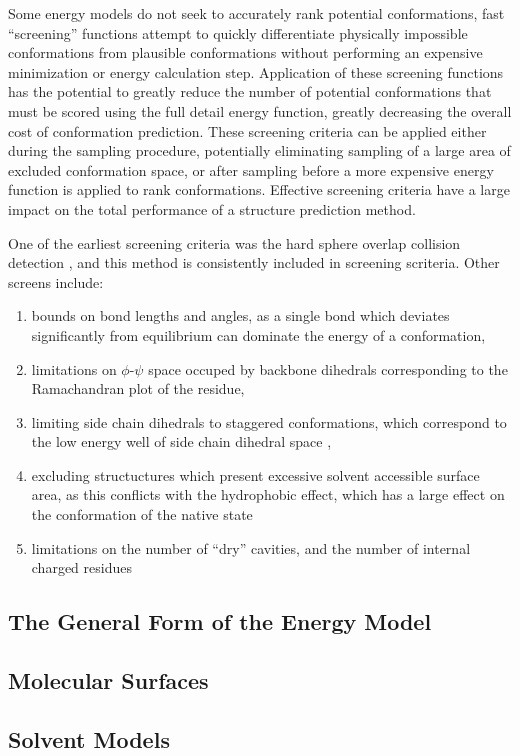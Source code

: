 Some energy models do not seek to accurately rank potential conformations, fast ``screening'' functions attempt to quickly differentiate physically impossible conformations from plausible conformations without performing an expensive minimization or energy calculation step.
Application of these screening functions has the potential to greatly reduce the number of potential conformations that must be scored using the full detail energy function, greatly decreasing the overall cost of conformation prediction.
These screening criteria can be applied either during the sampling procedure, potentially eliminating sampling of a large area of excluded conformation space, or after sampling before a more expensive energy function is applied to rank conformations.
Effective screening criteria have a large impact on the total performance of a structure prediction method.

One of the earliest screening criteria was the hard sphere overlap collision detection \cite{levinthal1966molecular}, and this method is consistently included in screening scriteria.
Other screens include:
\begin{enumerate}
\item bounds on bond lengths and angles, as a single bond which deviates significantly from equilibrium can dominate the energy of a conformation,
\item limitations on $\phi$-$\psi$ space occuped by backbone dihedrals corresponding to the Ramachandran plot of the residue,
\item limiting side chain dihedrals to staggered conformations, which correspond to the low energy well of side chain dihedral space \cite{moult1986algorithm},
\item excluding structuctures which present excessive solvent accessible surface area, as this conflicts with the hydrophobic effect, which has a large effect on the conformation of the native state \cite{chothia1975principles}
\item limitations on the number of ``dry'' cavities, and the number of internal charged residues \cite{moult1986algorithm}
\end{enumerate}

\subsection{The General Form of the Energy Model}
\label{subsection:energy_general_form}


\subsection{Molecular Surfaces}
\label{subsection:molecular_surfaces}


\subsection{Solvent Models}
\label{subsection:Solvent Models}

